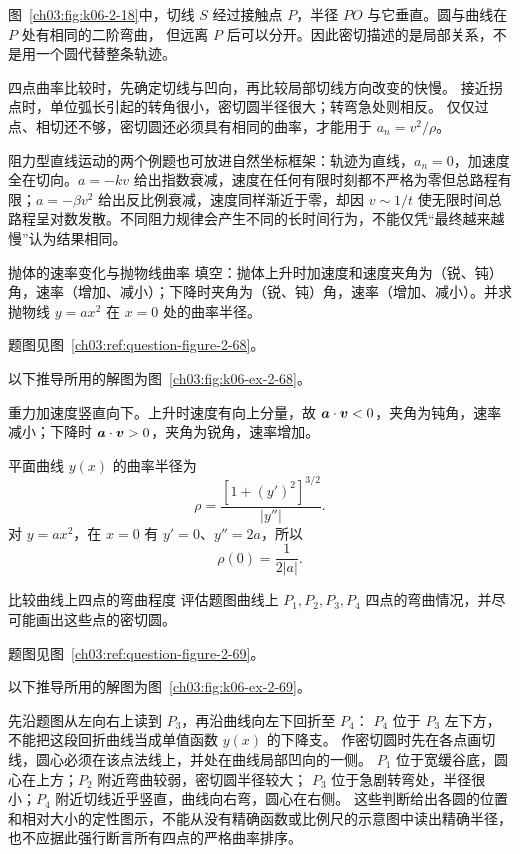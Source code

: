{图~\ref{ch03:fig:k06-2-18}中，切线 $S$ 经过接触点 $P$，半径 $PO$ 与它垂直。圆与曲线在 $P$ 处有相同的二阶弯曲，
但远离 $P$ 后可以分开。因此密切描述的是局部关系，不是用一个圆代替整条轨迹。

四点曲率比较时，先确定切线与凹向，再比较局部切线方向改变的快慢。
接近拐点时，单位弧长引起的转角很小，密切圆半径很大；转弯急处则相反。
仅仅过点、相切还不够，密切圆还必须具有相同的曲率，才能用于 $a_n=v^2/\rho$。

阻力型直线运动的两个例题也可放进自然坐标框架：轨迹为直线，$a_n=0$，加速度全在切向。$a=-kv$ 给出指数衰减，速度在任何有限时刻都不严格为零但总路程有限；$a=-\beta v^2$ 给出反比例衰减，速度同样渐近于零，却因 $v\sim1/t$ 使无限时间总路程呈对数发散。不同阻力规律会产生不同的长时间行为，不能仅凭“最终越来越慢”认为结果相同。

\begin{origexamplebox}{抛体的速率变化与抛物线曲率}\label{ch03:ex:k06-2-68}
填空：抛体上升时加速度和速度夹角为（锐、钝）角，速率（增加、减小）；下降时夹角为（锐、钝）角，速率（增加、减小）。并求抛物线 $y=ax^2$ 在 $x=0$ 处的曲率半径。
\par 题图见图~\ref{ch03:ref:question-figure-2-68}。
\KQuestionCQ
\end{origexamplebox}
\begin{xesolution}
以下推导所用的解图为图~\ref{ch03:fig:k06-ex-2-68}。

重力加速度竖直向下。上升时速度有向上分量，故 $\bm{a}\cdot\bm{v}<0$，夹角为钝角，速率减小；下降时 $\bm{a}\cdot\bm{v}>0$，夹角为锐角，速率增加。


\ProjectileCurvatureDiagram
平面曲线 $y(x)$ 的曲率半径为
\[
\rho=\frac{[1+(y')^2]^{3/2}}{|y''|}.
\]
对 $y=ax^2$，在 $x=0$ 有 $y'=0$、$y''=2a$，所以
\[
 \boxed{\rho(0)=\frac1{2|a|}}.
\]
\end{xesolution}


\begin{origexamplebox}{比较曲线上四点的弯曲程度}\label{ch03:ex:k06-2-69}
评估题图曲线上 $P_1,P_2,P_3,P_4$ 四点的弯曲情况，并尽可能画出这些点的密切圆。
\par 题图见图~\ref{ch03:ref:question-figure-2-69}。
\KQuestionCR
\end{origexamplebox}
\begin{xesolution}
以下推导所用的解图为图~\ref{ch03:fig:k06-ex-2-69}。

先沿题图从左向右上读到 $P_3$，再沿曲线向左下回折至 $P_4$：
$P_4$ 位于 $P_3$ 左下方，不能把这段回折曲线当成单值函数 $y(x)$ 的下降支。
作密切圆时先在各点画切线，圆心必须在该点法线上，并处在曲线局部凹向的一侧。
$P_1$ 位于宽缓谷底，圆心在上方；$P_2$ 附近弯曲较弱，密切圆半径较大；
$P_3$ 位于急剧转弯处，半径很小；$P_4$ 附近切线近乎竖直，曲线向右弯，圆心在右侧。
这些判断给出各圆的位置和相对大小的定性图示，不能从没有精确函数或比例尺的示意图中读出精确半径，
也不应据此强行断言所有四点的严格曲率排序。



\end{xesolution}}
